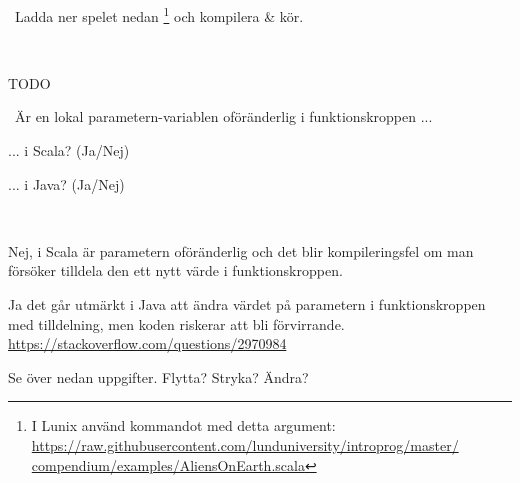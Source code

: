 \QUESTBEGIN

\Task  \what~Ladda ner spelet nedan \footnote{I Lunix använd kommandot  med detta argument: \url{https://raw.githubusercontent.com/lunduniversity/introprog/master/
compendium/examples/AliensOnEarth.scala}} och kompilera \& kör.


%

\SOLUTION

\TaskSolved \what~

\begin{CodeSmall}
TODO
\end{CodeSmall}


\QUESTEND






\QUESTBEGIN

\Task \what~Är en lokal parametern-variablen oföränderlig i funktionskroppen ...

\Subtask ... i Scala?  (Ja/Nej)

\Subtask ... i Java?  (Ja/Nej)


\SOLUTION

\TaskSolved \what~

\Subtask Nej, i Scala är parametern oföränderlig och det blir kompileringsfel om man försöker tilldela den ett nytt värde i funktionskroppen.

\Subtask Ja det går utmärkt i Java att ändra värdet på parametern i funktionskroppen med tilldelning, men koden riskerar att bli förvirrande.\\
\url{https://stackoverflow.com/questions/2970984}

\QUESTEND








\vspace{2em}\noindent\TODO Se över nedan uppgifter. Flytta? Stryka? Ändra?


